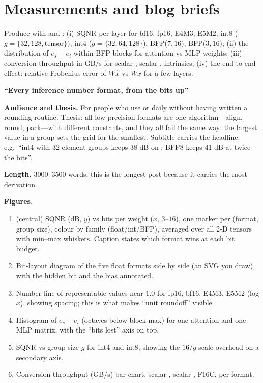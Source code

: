\section{Measurements and blog briefs}

Produce with  and : (i) SQNR per layer for bf16, fp16, E4M3, E5M2, int8 ($g=\{32,128,\text{tensor}\}$), int4 ($g=\{32,64,128\}$), BFP($7,16$), BFP($3,16$); (ii) the distribution of $e_s - e_i$ within BFP blocks for attention vs MLP weights; (iii) conversion throughput in GB/s for scalar , scalar , intrinsics; (iv) the end-to-end effect: relative Frobenius error of $W\hat{x}$ vs $Wx$ for a few layers.

\begin{blogbox}
 \textbf{``Every inference number format, from the bits up''}

\textbf{Audience and thesis.} For people who use  or  daily without having written a rounding routine. Thesis: all low-precision formats are one algorithm---align, round, pack---with different constants, and they all fail the same way: the largest value in a group sets the grid for the smallest. Subtitle carries the headline: e.g.\ ``int4 with 32-element groups keeps 38 dB on ; BFP8 keeps 41 dB at twice the bits''.

\textbf{Length.} 3000--3500 words; this is the longest post because it carries the most derivation.

\textbf{Figures.}
\begin{enumerate}
  \item {} (central) SQNR (dB, $y$) vs bits per weight ($x$, $3$--$16$), one marker per (format, group size), colour by family (float/int/BFP), averaged over all 2-D tensors with min--max whiskers. Caption states which format wins at each bit budget.
  \item {} Bit-layout diagram of the five float formats side by side (an SVG you draw), with the hidden bit and the bias annotated.
  \item {} Number line of representable values near $1.0$ for fp16, bf16, E4M3, E5M2 (log $x$), showing spacing; this is what makes ``unit roundoff'' visible.
  \item {} Histogram of $e_s - e_i$ (octaves below block max) for one attention and one MLP matrix, with the ``bits lost'' axis on top.
  \item {} SQNR vs group size $g$ for int4 and int8, showing the $16/g$ scale overhead on a secondary axis.
  \item {} Conversion throughput (GB/s) bar chart: scalar , scalar , F16C, per format.
\end{enumerate}


\end{blogbox}
